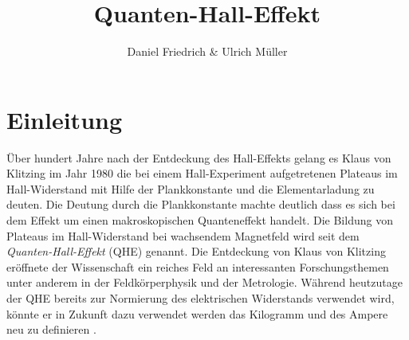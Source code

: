 \documentclass[paper=a4,fontsize=10pt,DIV=18,twocolumn,parskip=half]{scrartcl}
\numberwithin{equation}{section}    %
\begin{document}
\title{Quanten-Hall-Effekt}                  
\author{Daniel Friedrich \& Ulrich Müller}         
\date{}                                %
%
\section{Einleitung}
\label{Einleitung}
Über hundert Jahre nach der Entdeckung des Hall-Effekts gelang es Klaus von Klitzing im Jahr 1980 die bei einem Hall-Experiment aufgetretenen Plateaus im Hall-Widerstand mit Hilfe der Plankkonstante und die Elementarladung zu deuten. Die Deutung durch die Plankkonstante machte deutlich dass es sich bei dem Effekt um einen makroskopischen Quanteneffekt handelt. Die Bildung von Plateaus im Hall-Widerstand bei wachsendem Magnetfeld wird seit dem \emph{Quanten-Hall-Effekt} (QHE) genannt. Die Entdeckung von Klaus von Klitzing eröffnete der Wissenschaft ein reiches Feld an interessanten Forschungsthemen unter anderem in der Feldkörperphysik und der Metrologie. Während heutzutage der QHE bereits zur Normierung des elektrischen Widerstands verwendet wird, könnte er in Zukunft dazu verwendet werden das Kilogramm und des Ampere neu zu definieren \cite{janssen}. 
\end{document}
